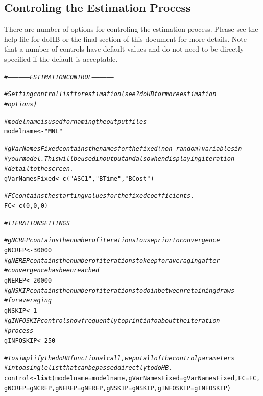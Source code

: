 \documentclass{article}\usepackage[]{graphicx}\usepackage[]{color}
\makeatletter
\newcommand{\hlnum}[1]{\textcolor[rgb]{0.686,0.059,0.569}{#1}}%
\newcommand{\hlstr}[1]{\textcolor[rgb]{0.192,0.494,0.8}{#1}}%
\newcommand{\hlcom}[1]{\textcolor[rgb]{0.678,0.584,0.686}{\textit{#1}}}%
\newcommand{\hlstd}[1]{\textcolor[rgb]{0.345,0.345,0.345}{#1}}%
\newcommand{\hlkwb}[1]{\textcolor[rgb]{0.69,0.353,0.396}{#1}}%
\newcommand{\hlkwc}[1]{\textcolor[rgb]{0.333,0.667,0.333}{#1}}%
\newcommand{\hlkwd}[1]{\textcolor[rgb]{0.737,0.353,0.396}{\textbf{#1}}}%
\newenvironment{kframe}{%
 \def\at@end@of@kframe{}%
 \ifinner\ifhmode%
  \def\at@end@of@kframe{\end{minipage}}%
  \begin{minipage}{\columnwidth}%
 \fi\fi%
 \def\FrameCommand##1{\hskip\@totalleftmargin \hskip-\fboxsep
 \colorbox{shadecolor}{##1}\hskip-\fboxsep
     \hskip-\linewidth \hskip-\@totalleftmargin \hskip\columnwidth}%
 \MakeFramed {\advance\hsize-\width
   \@totalleftmargin\z@ \linewidth\hsize
   \@setminipage}}%
 {\par\unskip\endMakeFramed%
 \at@end@of@kframe}
\newenvironment{knitrout}{}{} %
\makeatother
\begin{document}
\subsection*{Controling the Estimation Process}

There are number of options for controling the estimation process. Please see the help file for doHB or the final section of this document for more details. Note that a number of controls have default values and do not need to be directly specified if the default is acceptable.

\begin{knitrout}
\color{fgcolor}\begin{kframe}
\begin{alltt}
\hlcom{# ------------------ ESTIMATION CONTROL ------------------}

\hlcom{# Setting control list for estimation (see ?doHB for more estimation}
\hlcom{# options)}

\hlcom{# modelname is used for naming the output files}
\hlstd{modelname} \hlkwb{<-} \hlstr{"MNL"}

\hlcom{# gVarNamesFixed contains the names for the fixed (non-random) variables in}
\hlcom{# your model. This will be used in output and also when displaying iteration}
\hlcom{# detail to the screen.}
\hlstd{gVarNamesFixed} \hlkwb{<-} \hlkwd{c}\hlstd{(}\hlstr{"ASC1"}\hlstd{,} \hlstr{"BTime"}\hlstd{,} \hlstr{"BCost"}\hlstd{)}

\hlcom{# FC contains the starting values for the fixed coefficients.}
\hlstd{FC} \hlkwb{<-} \hlkwd{c}\hlstd{(}\hlnum{0}\hlstd{,} \hlnum{0}\hlstd{,} \hlnum{0}\hlstd{)}

\hlcom{# ITERATION SETTINGS}

\hlcom{# gNCREP contains the number of iterations to use prior to convergence}
\hlstd{gNCREP} \hlkwb{<-} \hlnum{30000}
\hlcom{# gNEREP contains the number of iterations to keep for averaging after}
\hlcom{# convergence has been reached}
\hlstd{gNEREP} \hlkwb{<-} \hlnum{20000}
\hlcom{# gNSKIP contains the number of iterations to do in between retaining draws}
\hlcom{# for averaging}
\hlstd{gNSKIP} \hlkwb{<-} \hlnum{1}
\hlcom{# gINFOSKIP controls how frequently to print info about the iteration}
\hlcom{# process}
\hlstd{gINFOSKIP} \hlkwb{<-} \hlnum{250}

\hlcom{# To simplify the doHB functional call, we put all of the control parameters}
\hlcom{# into a single list that can be passed directly to doHB.}
\hlstd{control} \hlkwb{<-} \hlkwd{list}\hlstd{(}\hlkwc{modelname} \hlstd{= modelname,} \hlkwc{gVarNamesFixed} \hlstd{= gVarNamesFixed,} \hlkwc{FC} \hlstd{= FC,}
    \hlkwc{gNCREP} \hlstd{= gNCREP,} \hlkwc{gNEREP} \hlstd{= gNEREP,} \hlkwc{gNSKIP} \hlstd{= gNSKIP,} \hlkwc{gINFOSKIP} \hlstd{= gINFOSKIP)}
\end{alltt}
\end{kframe}
\end{knitrout}
\end{document}
